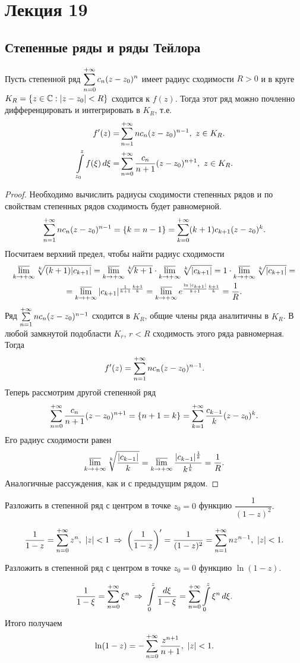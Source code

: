 	\section{Лекция 19}
	\subsection{Степенные ряды и ряды Тейлора}
	\begin{theorem}
		Пусть степенной ряд $\displaystyle\sum\limits_{n=0}^{+\infty}c_n(z-z_0)^n$ имеет радиус сходимости $R > 0$ и в круге $K_R = \{ z\in\mathbb{C}:|z-z_0| < R \}$ сходится к $f(z)$.
		Тогда этот ряд можно почленно дифференцировать и интегрировать в $ K_R $, т.е.
		\begin{align*}
			f'(z) = &\sum\limits_{n=1}^{+\infty}nc_n(z-z_0)^{n-1},\ z\in K_R.\\
			\int\limits_{z_0}^zf(\xi)\,d\xi = &\sum\limits_{n=0}^{+\infty}\frac{c_n}{n+1}(z-z_0)^{n+1},\ z\in K_R.
		\end{align*}
	\end{theorem}
	\begin{proof}
		Необходимо вычислить радиусы сходимости степенных рядов и по свойствам степенных рядов сходимость будет равномерной.
		\[ \sum\limits_{n=1}^{+\infty}nc_n(z-z_0)^{n-1} = \{k = n-1\} = \sum\limits_{k=0}^{+\infty}(k+1)c_{k+1}(z-z_0)^k. \]
		Посчитаем верхний предел, чтобы найти радиус сходимости
		\begin{multline*}
			\operatorname*{\overline{lim}}_{k \to +\infty}\sqrt[k]{(k+1)|c_{k+1}|} = \operatorname*{\overline{lim}}_{k \to +\infty}\sqrt[k]{k+1} \cdot \operatorname*{\overline{lim}}_{k \to +\infty}\sqrt[k]{|c_{k+1}|} = 1\cdot\operatorname*{\overline{lim}}_{k \to +\infty}\sqrt[k]{|c_{k+1}|} =\\
			= \operatorname*{\overline{lim}}_{k \to +\infty}|c_{k+1}|^{\frac{1}{k+1}\frac{k+1}{k}} = \operatorname*{\overline{lim}}_{k \to +\infty}e^{\frac{\ln |c_{k+1}|}{k+1}\frac{k+1}{k}} = \frac{1}{R}.
		\end{multline*}
		Ряд $\sum\limits_{n=1}^{+\infty}nc_n(z-z_0)^{n-1}$ сходится в $K_R$, общие члены ряда аналитичны в $K_R$. В любой замкнутой подобласти $K_r$, $r<R$ сходимость этого ряда равномерная. Тогда
		\[ f'(z) = \sum\limits_{n=1}^{+\infty}nc_n(z-z_0)^{n-1}. \]
		Теперь рассмотрим другой степенной ряд
		\[ \sum\limits_{n=0}^{+\infty}\frac{c_n}{n+1}(z-z_0)^{n+1} = \{n+1 = k\} = \sum\limits_{k=1}^{+\infty}\frac{c_{k-1}}{k}(z-z_0)^k. \]
		Его радиус сходимости равен
		\[ \operatorname*{\overline{lim}}_{k\to+\infty}\sqrt[k]{\frac{|c_{k-1}|}{k}} = \operatorname*{\overline{lim}}_{k\to+\infty}\frac{|c_{k-1}|^\frac{1}{k}}{k^\frac{1}{k}} = \frac{1}{R}.\]
		Аналогичные рассуждения, как и с предыдущим рядом.
	\end{proof}
	\newpage
	\begin{example}
		Разложить в степенной ряд с центром в точке $z_0 = 0$ функцию $\dfrac{1}{(1-z)^2}.$
	\end{example}
	\[ \frac{1}{1-z} = \Sum_{n=0}^{+\infty}z^n,\ |z| < 1\implies\left( \frac{1}{1-z}\right)'=\frac{1}{(1-z)^2}=\Sum_{n=1}^{+\infty}nz^{n-1},\ |z|<1.\]
	\begin{example}
		Разложить в степенной ряд с центром в точке $z_0 = 0$ функцию $\ln(1-z)$.
	\end{example}
	\[ \frac{1}{1-\xi} = \sum\limits_{n=0}^{+\infty}\xi^n\;\Rightarrow\;\int\limits_0^z\frac{d\xi}{1-\xi} = \sum\limits_{n=0}^{+\infty}\int\limits_0^z\xi^n\,d\xi. \]
	Итого получаем
	\[ \ln(1-z) = -\sum\limits_{n=0}^{+\infty}\frac{z^{n+1}}{n+1},\ |z|<1. \]
